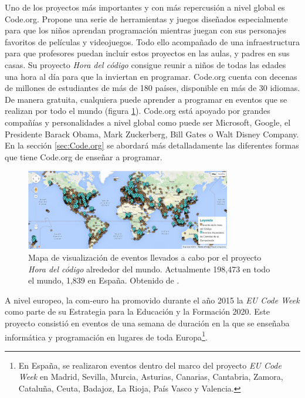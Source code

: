 Uno de los proyectos más importantes y con más repercusión a nivel global es Code.org\cite{code-org}. Propone una serie de herramientas y juegos diseñados especialmente para que los niños aprendan programación mientras juegan con sus personajes favoritos de películas y videojuegos. Todo ello acompañado de una infraestructura para que profesores puedan incluir estos proyectos en las aulas, y padres en sus casas.
Su proyecto \emph{Hora del código}\cite{hour-of-code} consigue reunir a niños de todas las edades una hora al día para que la inviertan en programar.
Code.org cuenta con decenas de millones de estudiantes de más de 180 países, disponible en más de 30 idiomas. De manera gratuita, cualquiera puede aprender a programar en eventos que se realizan por todo el mundo (figura \ref{fig:map-hour-code}). Code.org está apoyado por grandes compañías y personalidades a nivel global como puede ser Microsoft, Google, el Presidente Barack Obama, Mark Zuckerberg, Bill Gates o Walt Disney Company. {\color{gree}En la sección \ref{sec:Code.org} se abordará más detalladamente las diferentes formas que tiene Code.org de enseñar a programar.}


\begin{figure}[!ht]
	\begin{centering}
		\includegraphics[width=0.8\textwidth]{images/map-hour-code.png}
			\caption{Mapa de visualización de eventos llevados a cabo por el proyecto \emph{Hora del código} alrededor del mundo. Actualmente 198,473 en todo el mundo, 1,839 en España. Obtenido de \cite{hour-of-code}.}
				\label{fig:map-hour-code}
	\end{centering}
\end{figure}


A nivel europeo, la \Gls{com-euro}\cite{ec-code-week} ha promovido durante el año 2015 la \emph{EU Code Week}\cite{code-week} como parte de su Estrategia para la Educación y la Formación 2020. Este proyecto consistió en eventos de una semana de duración en la que se enseñaba informática y programación en lugares de toda Europa\footnote{En España, se realizaron eventos dentro del marco del proyecto \emph{EU Code Week} en Madrid, Sevilla, Murcia, Asturias, Canarias, Cantabria, Zamora, Cataluña, Ceuta, Badajoz, La Rioja, País Vasco y Valencia.}.


